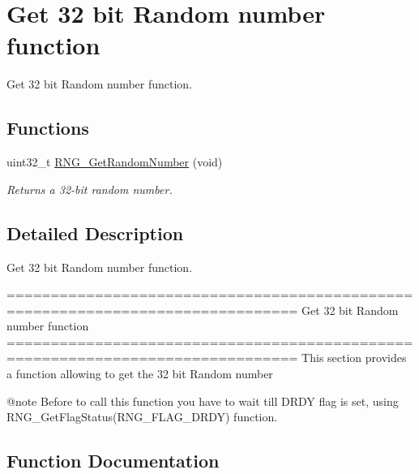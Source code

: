 \hypertarget{group___r_n_g___group2}{}\section{Get 32 bit Random number function}
\label{group___r_n_g___group2}


Get 32 bit Random number function.  


\subsection*{Functions}
\begin{DoxyCompactItemize}
\item 
uint32\+\_\+t \hyperlink{group___r_n_g___group2_ga2cead4780224fd74a3fc15543c98ed36}{R\+N\+G\+\_\+\+Get\+Random\+Number} (void)
\begin{DoxyCompactList}\small\item\em Returns a 32-\/bit random number. \end{DoxyCompactList}\end{DoxyCompactItemize}


\subsection{Detailed Description}
Get 32 bit Random number function. 

\begin{DoxyVerb} ===============================================================================
                      Get 32 bit Random number function
 ===============================================================================  
  This section provides a function allowing to get the 32 bit Random number  
  
  @note  Before to call this function you have to wait till DRDY flag is set,
         using RNG_GetFlagStatus(RNG_FLAG_DRDY) function. \end{DoxyVerb}
 

\subsection{Function Documentation}
\hypertarget{group___r_n_g___group2_ga2cead4780224fd74a3fc15543c98ed36}{}
